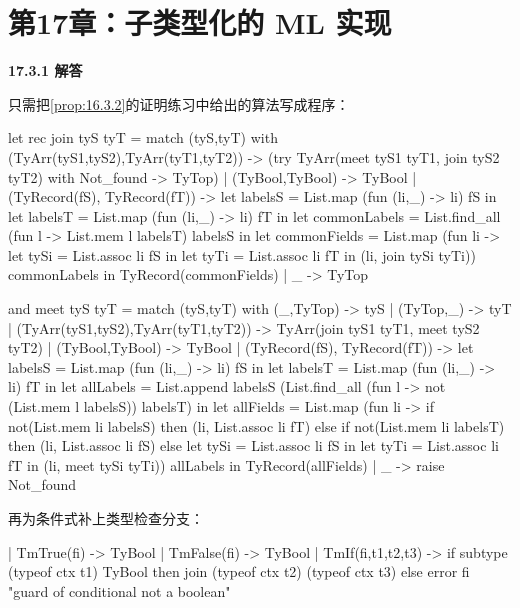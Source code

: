 \newpage
\section{第17章：子类型化的 ML 实现}

\begin{taplauthorsolutionentrybox}
\label{sol:author:17.3.1}
\textbf{17.3.1 解答}

只需把\cref{prop:16.3.2}的证明练习中给出的算法写成程序：

\begin{taplocamlcode}
let rec join tyS tyT =
  match (tyS,tyT) with
    (TyArr(tyS1,tyS2),TyArr(tyT1,tyT2)) ->
      (try TyArr(meet tyS1 tyT1, join tyS2 tyT2)
       with Not_found -> TyTop)
  | (TyBool,TyBool) ->
      TyBool
  | (TyRecord(fS), TyRecord(fT)) ->
      let labelsS = List.map (fun (li,_) -> li) fS in
      let labelsT = List.map (fun (li,_) -> li) fT in
      let commonLabels =
        List.find_all (fun l -> List.mem l labelsT) labelsS in
      let commonFields =
        List.map (fun li ->
                    let tySi = List.assoc li fS in
                    let tyTi = List.assoc li fT in
                    (li, join tySi tyTi))
                 commonLabels in
      TyRecord(commonFields)
  | _ ->
      TyTop

and meet tyS tyT =
  match (tyS,tyT) with
    (_,TyTop) -> tyS
  | (TyTop,_) -> tyT
  | (TyArr(tyS1,tyS2),TyArr(tyT1,tyT2)) ->
      TyArr(join tyS1 tyT1, meet tyS2 tyT2)
  | (TyBool,TyBool) ->
      TyBool
  | (TyRecord(fS), TyRecord(fT)) ->
      let labelsS = List.map (fun (li,_) -> li) fS in
      let labelsT = List.map (fun (li,_) -> li) fT in
      let allLabels =
        List.append
          labelsS
          (List.find_all
            (fun l -> not (List.mem l labelsS)) labelsT) in
      let allFields =
        List.map (fun li ->
                    if not(List.mem li labelsS) then
                      (li, List.assoc li fT)
                    else if not(List.mem li labelsT) then
                      (li, List.assoc li fS)
                    else
                      let tySi = List.assoc li fS in
                      let tyTi = List.assoc li fT in
                      (li, meet tySi tyTi))
                 allLabels in
      TyRecord(allFields)
  | _ ->
      raise Not_found
\end{taplocamlcode}

再为条件式补上类型检查分支：

\begin{taplocamlcode}
| TmTrue(fi) ->
    TyBool
| TmFalse(fi) ->
    TyBool
| TmIf(fi,t1,t2,t3) ->
    if subtype (typeof ctx t1) TyBool then
      join (typeof ctx t2) (typeof ctx t3)
    else
      error fi "guard of conditional not a boolean"
\end{taplocamlcode}


\end{taplauthorsolutionentrybox}
